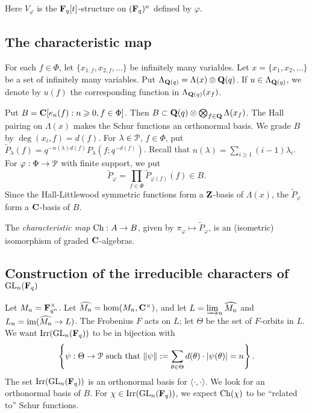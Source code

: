 \documentclass{article}
\begin{document}
Here $V_\varphi$ is the $\mathbf{F}_q[t]$-structure on $(\mathbf{F}_q)^n$ defined by 
$\varphi$. 





\subsection{The characteristic map}

For each $f\in \Phi$, let $\{x_{1,f},x_{2,f},\dots\}$ be infinitely many 
variables. Let $x=\{x_1,x_2,\dots\}$ be a set of infinitely many variables. 
Put $\Lambda_{\mathbf{Q}(q)} = \Lambda(x)\otimes \mathbf{Q}(q)$. If 
$u\in \Lambda_{\mathbf{Q}(q)}$, we denote by 
$u(f)$ the corresponding function in 
$\Lambda_{\mathbf{Q}(q)}(x_f)$. 

Put $B=\mathbf{C}[e_n(f):n\geqslant 0, f\in \Phi]$. Then 
$B\subset \mathbf{Q}(q)\otimes \bigotimes_{f\in \mathbf{Q}} \Lambda(x_f)$. The Hall pairing on 
$\Lambda(x)$ makes the Schur functions an orthonormal basis. We grade $B$ by 
$\deg(x_i,f) = d(f)$. For $\lambda\in \mathcal{P}$, $f\in \Phi$, put 
$\widetilde P_\lambda(f) = q^{-n(\lambda) d(f)} P_\lambda(f; q^{-d(f)})$. Recall 
that $n(\lambda) = \sum_{i\geqslant 1} (i-1) \lambda_i$. 
For $\varphi:\Phi \to \mathcal{P}$ with finite support, we put 
\[
  \widetilde P_\varphi = \prod_{f\in \Phi} \widetilde P_{\varphi(f)} (f) \in B .
\]
Since the Hall-Littlewood symmetric functions form a $\mathbf{Z}$-basis of 
$\Lambda(x)$, the $\widetilde P_\varphi$ form a $\mathbf{C}$-basis of $B$. 

The \emph{characteristic map} $\operatorname{Ch}:A\to B$, given by 
$\pi_\varphi\mapsto \widetilde P_\varphi$, is an (isometric) isomorphism of 
graded $\mathbf{C}$-algebras. 


\subsection{Construction of the irreducible characters of \texorpdfstring{$\operatorname{GL}_n(\mathbf{F}_q)$}{GLnFq}}

Let $M_n=\mathbf{F}_{q^n}^\times$. Let $\widehat{M_n} = \hom(M_n,\mathbf{C}^\times)$, and let 
$L=\varinjlim_n \widehat{M_n}$ and $L_n=\operatorname{im}(\widehat{M_n} \to L)$. The 
Frobenius $F$ acts on $L$; let $\Theta$ be the set of $F$-orbits in $L$. 
We want $\operatorname{Irr}(\operatorname{GL}_n(\mathbf{F}_q))$ to be in bijection with 
\[
  \left\{\psi:\Theta\to \mathcal{P}\text{ such that }\|\psi\| := \sum_{\theta\in \Theta} d(\theta) \cdot |\psi(\theta)| = n\right\} .
\]
The set $\operatorname{Irr}(\operatorname{GL}_n(\mathbf{F}_q))$ is an orthonormal basis for 
$\langle \cdot,\cdot\rangle$. We look for an orthonormal basis of $B$. For 
$\chi\in \operatorname{Irr}(\operatorname{GL}_n(\mathbf{F}_q))$, we expect 
$\operatorname{Ch}(\chi)$ to be ``related to'' Schur functions. 
\end{document}

